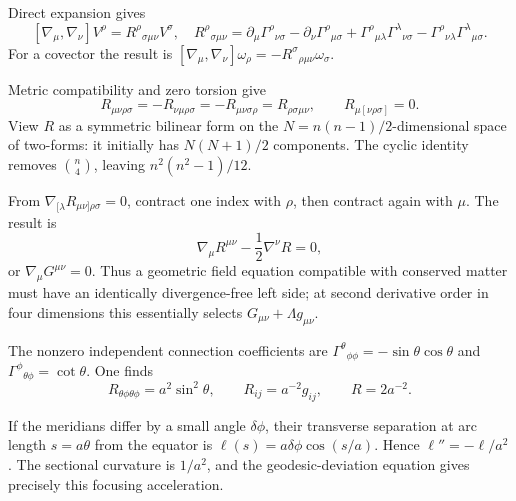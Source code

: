 \begin{solutions}

\begin{solution}
Direct expansion gives
\[
[\nabla_\mu,\nabla_\nu]V^\rho
=R^\rho{}_{\sigma\mu\nu}V^\sigma,
\quad
R^\rho{}_{\sigma\mu\nu}
=\partial_\mu\Gamma^\rho{}_{\nu\sigma}
-\partial_\nu\Gamma^\rho{}_{\mu\sigma}
+\Gamma^\rho{}_{\mu\lambda}\Gamma^\lambda{}_{\nu\sigma}
-\Gamma^\rho{}_{\nu\lambda}\Gamma^\lambda{}_{\mu\sigma}.
\]
For a covector the result is
\([\nabla_\mu,\nabla_\nu]\omega_\rho
=-R^\sigma{}_{\rho\mu\nu}\omega_\sigma\).
\end{solution}

\begin{solution}
Metric compatibility and zero torsion give
\[
R_{\mu\nu\rho\sigma}=-R_{\nu\mu\rho\sigma}
=-R_{\mu\nu\sigma\rho}
=R_{\rho\sigma\mu\nu},\qquad
R_{\mu[\nu\rho\sigma]}=0.
\]
View \(R\) as a symmetric bilinear form on the
\(N=n(n-1)/2\)-dimensional space of two-forms: it initially has
\(N(N+1)/2\) components.  The cyclic identity removes
\(\binom n4\), leaving \(n^2(n^2-1)/12\).
\end{solution}

\begin{solution}
From \(\nabla_{[\lambda}R_{\mu\nu]\rho\sigma}=0\), contract one index with
\(\rho\), then contract again with \(\mu\).  The result is
\[
\nabla_\mu R^{\mu\nu}-\frac12\nabla^\nu R=0,
\]
or \(\nabla_\mu G^{\mu\nu}=0\).  Thus a geometric field equation compatible
with conserved matter must have an identically divergence-free left side;
at second derivative order in four dimensions this essentially selects
\(G_{\mu\nu}+\Lambda g_{\mu\nu}\).
\end{solution}

\begin{solution}
The nonzero independent connection coefficients are
\(\Gamma^\theta{}_{\phi\phi}=-\sin\theta\cos\theta\) and
\(\Gamma^\phi{}_{\theta\phi}=\cot\theta\).  One finds
\[
R_{\theta\phi\theta\phi}=a^2\sin^2\theta,\qquad
R_{ij}=a^{-2}g_{ij},\qquad R=2a^{-2}.
\]
\end{solution}

\begin{solution}
If the meridians differ by a small angle \(\delta\phi\), their transverse
separation at arc length \(s=a\theta\) from the equator is
\(\ell(s)=a\delta\phi\cos(s/a)\).  Hence
\(\ell''=-\ell/a^2\).  The sectional curvature is \(1/a^2\), and the
geodesic-deviation equation gives precisely this focusing acceleration.
\end{solution}


\end{solutions}
